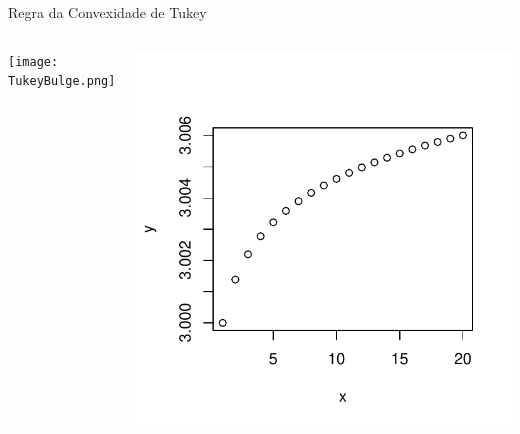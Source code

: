 \documentclass{beamer}\usepackage[]{graphicx}\usepackage[]{color}
\newenvironment{knitrout}{}{} %
\renewenvironment{knitrout}{\setlength{\topsep}{0mm}}{}
\begin{document}
\begin{frame}{Regra da Convexidade de Tukey}

\begin{columns}[c]

\centering
\texttt{[image: TukeyBulge.png]}

\centering
\begin{knitrout}
\color{fgcolor}
\includegraphics[width=0.7\linewidth]{figure/rem6-1} 

\end{knitrout}

\end{columns}

\end{frame}
\end{document}
